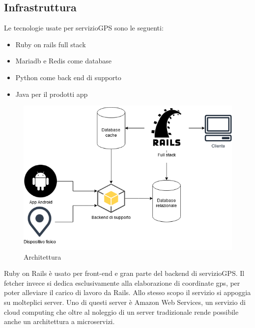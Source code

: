 \documentclass[12pt]{article}
\begin{document}
\subsection{Infrastruttura}
Le tecnologie usate per servizioGPS sono le seguenti:
\begin{itemize}
  \item Ruby on rails full stack
  \item Mariadb e Redis come database
  \item Python come back end di supporto
  \item Java per il prodotti app 
\end{itemize}
\begin{figure}[H]
\includegraphics[scale = 0.6]{infrastructure.png}
\caption{Architettura}
\label{fig:mesh1}
\end{figure}
Ruby on Rails è usato per front-end e gran parte del backend di servizioGPS. 
Il fetcher invece si dedica esclusivamente alla elaborazione di coordinate gps,
per poter alleviare il carico di lavoro da Rails.
Allo stesso scopo il servizio si appoggia su molteplici server.
Uno di questi server è Amazon Web Services, un servizio di cloud computing 
che oltre al noleggio di un server tradizionale rende possibile 
anche un architettura a microservizi. 
\end{document}

